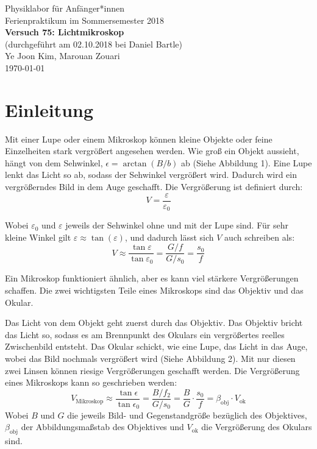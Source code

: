 \documentclass[11pt,a4paper]{article}
\begin{document}
	
	{
		\centering 
		\large 
		Physiklabor für Anfänger*innen \\
		Ferienpraktikum im Sommersemester 2018 \\[4mm]
		\textbf{\LARGE 
			Versuch 75: Lichtmikroskop
		} \\[3mm]
		(durchgeführt am 02.10.2018 bei Daniel Bartle) \\
		Ye Joon Kim, Marouan Zouari\\
		\today \\[10mm]
	}
	\tableofcontents
\section{Einleitung}
Mit einer Lupe oder einem Mikroskop können kleine Objekte oder feine Einzelheiten stark vergrößert angesehen werden. Wie groß ein Objekt aussieht, hängt von dem Sehwinkel, $\epsilon =\arctan(B/b)$ ab (Siehe Abbildung 1). Eine Lupe lenkt das Licht so ab, sodass der Sehwinkel vergrößert wird. Dadurch wird ein vergrößerndes Bild in dem Auge geschafft. Die Vergrößerung ist definiert durch:
\begin{equation}
V = \frac{\varepsilon}{\varepsilon_0}
\end{equation}

Wobei $\varepsilon_0$ und $\varepsilon$ jeweils der Sehwinkel ohne und mit der Lupe sind. Für sehr kleine Winkel gilt $\varepsilon \approx \tan(\varepsilon)$, und dadurch lässt sich $V$ auch schreiben als:
\begin{equation}
V \approx \frac{\tan\varepsilon}{\tan\varepsilon_0} = \frac{G/f}{G/s_0} = \frac{s_0}{f}
\end{equation}

Ein Mikroskop funktioniert ähnlich, aber es kann viel stärkere Vergrößerungen schaffen. Die zwei wichtigsten Teile eines Mikroskops sind das Objektiv und das Okular. 

Das Licht von dem Objekt geht zuerst durch das Objektiv. Das Objektiv bricht das Licht so, sodass es am Brennpunkt des Okulars ein vergrößertes reelles Zwischenbild entsteht. Das Okular schickt, wie eine Lupe, das Licht in das Auge, wobei das Bild nochmals vergrößert wird (Siehe Abbildung 2). Mit nur diesen zwei Linsen können riesige Vergrößerungen geschafft werden. Die Vergrößerung eines Mikroskops kann so geschrieben werden:
\begin{equation}
V_\textrm{Mikroskop} \approx \frac{\tan\epsilon}{\tan\epsilon_0}= \frac{B/f_2}{G/s_0} = \frac{B}{G}\cdot\frac{s_0}{f} = \beta_\textrm{obj}\cdot V_\textrm{ok}
\end{equation}
Wobei $B$ und $G$ die jeweils Bild- und Gegenstandgröße bezüglich des Objektives, $\beta_\textrm{obj}$ der Abbildungsmaßstab des Objektives und $V_\textrm{ok}$ die Vergrößerung des Okulars sind. 
\end{document}
